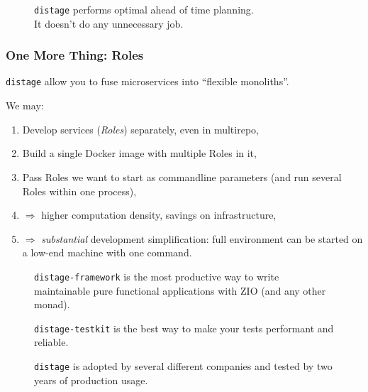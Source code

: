 \documentclass[usenames,dvipsnames]{beamer}
\newcommand{\distage}{\texttt{distage}\xspace}
\begin{document}
\begin{frame}
  \begin{figure}
    \huge \distage performs optimal ahead of time planning.
    \\
    It doesn't  do any unnecessary job.
  \end{figure}
\end{frame}

\begin{frame}
  \frametitle{One More Thing: Roles}
  \distage allow you to fuse microservices into ``flexible monoliths''.

  \vspace{0.3cm}
  We may:
  \begin{enumerate}
  \item Develop services (\textit{Roles}\footnotemark[1]) separately, even in multirepo,
  \item Build a single Docker image with multiple Roles in it,
  \item Pass Roles we want to start as commandline parameters (and run several Roles within one process),
  \item $\Rightarrow$ higher computation density, savings on infrastructure,
  \item $\Rightarrow$ \textit{substantial} development simplification: full environment can be started on a low-end machine with one command.
  \end{enumerate}
\end{frame}

\begin{frame}
  \begin{figure}
    \texttt{distage-framework} is the most productive way to write maintainable pure functional applications with ZIO (and any other monad).
  \end{figure}
  \begin{figure}
    \texttt{distage-testkit} is the best way to make your tests performant and reliable.
  \end{figure}
  \begin{figure}
    \distage is adopted by several different companies and tested by two years of production usage.
  \end{figure}
\end{frame}
\end{document}
